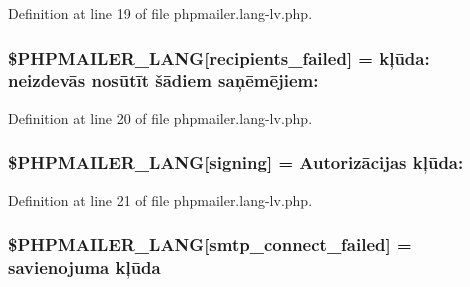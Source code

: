 Definition at line 19 of file phpmailer.\+lang-\/lv.\+php.

\subsubsection[{\texorpdfstring{\$\+P\+H\+P\+M\+A\+I\+L\+E\+R\+\_\+\+L\+A\+NG}{$PHPMAILER_LANG}}]{\setlength{\rightskip}{0pt plus 5cm}\$P\+H\+P\+M\+A\+I\+L\+E\+R\+\_\+\+L\+A\+NG\mbox{[}\textquotesingle{}recipients\+\_\+failed\textquotesingle{}\mbox{]} =  kļūda\+: neizdevās nosūtīt šādiem saņēmējiem\+: \textquotesingle{}}\hypertarget{phpmailer_8lang-lv_8php_a7589d30bb9b368327c2df015f3e6bcba}{}\label{phpmailer_8lang-lv_8php_a7589d30bb9b368327c2df015f3e6bcba}


Definition at line 20 of file phpmailer.\+lang-\/lv.\+php.

\subsubsection[{\texorpdfstring{\$\+P\+H\+P\+M\+A\+I\+L\+E\+R\+\_\+\+L\+A\+NG}{$PHPMAILER_LANG}}]{\setlength{\rightskip}{0pt plus 5cm}\$P\+H\+P\+M\+A\+I\+L\+E\+R\+\_\+\+L\+A\+NG\mbox{[}\textquotesingle{}signing\textquotesingle{}\mbox{]} = \textquotesingle{}Autorizācijas kļūda\+: \textquotesingle{}}\hypertarget{phpmailer_8lang-lv_8php_a68e437bdb9b968a5a67320f03d231565}{}\label{phpmailer_8lang-lv_8php_a68e437bdb9b968a5a67320f03d231565}


Definition at line 21 of file phpmailer.\+lang-\/lv.\+php.

\subsubsection[{\texorpdfstring{\$\+P\+H\+P\+M\+A\+I\+L\+E\+R\+\_\+\+L\+A\+NG}{$PHPMAILER_LANG}}]{\setlength{\rightskip}{0pt plus 5cm}\$P\+H\+P\+M\+A\+I\+L\+E\+R\+\_\+\+L\+A\+NG\mbox{[}\textquotesingle{}smtp\+\_\+connect\+\_\+failed\textquotesingle{}\mbox{]} =  savienojuma kļūda\textquotesingle{}}\hypertarget{phpmailer_8lang-lv_8php_a7b321d4ca1e9df702403ed4c61aa0980}{}\label{phpmailer_8lang-lv_8php_a7b321d4ca1e9df702403ed4c61aa0980}


